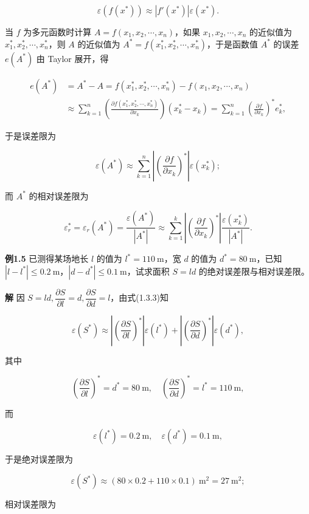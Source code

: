 \documentclass[
  10pt,
  a4paper,
]{article}
\begin{document}
\[
\varepsilon(f(x^*))\approx |f'(x^*)|\varepsilon(x^*).
\]

当 \(f\) 为多元函数时计算 \(A=f(x_1,x_2,\cdots,x_n)\)，如果
\(x_1,x_2,\cdots,x_n\) 的近似值为 \(x_1^*,x_2^*,\cdots,x_n^*\)，则 \(A\)
的近似值为 \(A^*=f(x_1^*,x_2^*,\cdots,x_n^*)\)，于是函数值 \(A^*\)
的误差 \(e(A^*)\) 由 Taylor 展开，得

\[
\begin{aligned}
e(A^*)&=A^*-A=f(x_1^*,x_2^*,\cdots,x_n^*)-f(x_1,x_2,\cdots,x_n)\\
&\approx\sum_{k=1}^{n}\left(\frac{\partial f(x_1^*,x_2^*,\cdots,x_n^*)}{\partial x_k}\right)(x_k^*-x_k)
=\sum_{k=1}^{n}\left(\frac{\partial f}{\partial x_k}\right)^*e_k^*,
\end{aligned}
\]

于是误差限为

\[
\varepsilon(A^*)\approx\sum_{k=1}^{n}\left|\left(\frac{\partial f}{\partial x_k}\right)^*\right|\varepsilon(x_k^*);
\tag{1.3.3}
\]

而 \(A^*\) 的相对误差限为

\[
\varepsilon_r^*=\varepsilon_r(A^*)=\frac{\varepsilon(A^*)}{|A^*|}\approx\sum_{k=1}^{k}\left|\left(\frac{\partial f}{\partial x_k}\right)^*\right|\frac{\varepsilon(x_k^*)}{|A^*|}.
\tag{1.3.4}
\]

\textbf{例1.5} 已测得某场地长 \(l\) 的值为 \(l^*=110\ \mathrm{m}\)，宽
\(d\) 的值为 \(d^*=80\ \mathrm{m}\)，已知
\(|l-l^*|\leqslant 0.2\ \mathrm{m}\)，\(|d-d^*|\leqslant 0.1\ \mathrm{m}\)，试求面积
\(S=ld\) 的绝对误差限与相对误差限。

\textbf{解} 因
\(S=ld,\dfrac{\partial S}{\partial l}=d,\dfrac{\partial S}{\partial d}=l\)，由式(1.3.3)知

\[
\varepsilon(S^*)\approx\left|\left(\frac{\partial S}{\partial l}\right)^*\right|\varepsilon(l^*)+\left|\left(\frac{\partial S}{\partial d}\right)^*\right|\varepsilon(d^*),
\]

其中

\[
\left(\frac{\partial S}{\partial l}\right)^*=d^*=80\ \mathrm{m},\quad
\left(\frac{\partial S}{\partial d}\right)^*=l^*=110\ \mathrm{m},
\]

而

\[
\varepsilon(l^*)=0.2\ \mathrm{m},\quad\varepsilon(d^*)=0.1\ \mathrm{m},
\]

于是绝对误差限为

\[
\varepsilon(S^*)\approx(80\times0.2+110\times0.1)\ \mathrm{m}^2=27\ \mathrm{m}^2;
\]

相对误差限为
\end{document}

